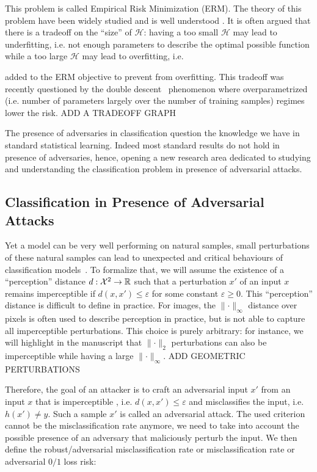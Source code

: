 This problem is called Empirical Risk Minimization (ERM). The theory of this problem have been widely studied and is well understood . It is often argued that there is a tradeoff on the ``size'' of $\mathcal{H}$: having a too small $\mathcal{H}$ may lead to underfitting, i.e. not enough parameters to describe the optimal possible function while a too large $\mathcal{H}$ may lead to overfitting, i.e.


added to the ERM objective to prevent from overfitting. This tradeoff was recently questioned by the double descent~\citep{belkin2019reconciling} phenomenon where overparametrized (i.e. number of parameters largely over the number of training samples) regimes lower the risk.
ADD A TRADEOFF GRAPH

The presence of adversaries in classification question the knowledge we have in standard statistical learning. Indeed most standard results do not hold in presence of adversaries, hence, opening a new research area dedicated to studying and understanding the classification problem in presence of adversarial attacks.

\subsection{Classification in Presence of Adversarial Attacks}

Yet a model can be very well performing on natural samples, small perturbations of these natural samples can lead to unexpected and critical behaviours of classification models~\citep{biggio2013evasion,Szegedy2013IntriguingPO}. To formalize that, we will assume the existence of a ``perception'' distance $d:\mathcal{X}^2\to\mathbb{R}$ such that a perturbation $x'$ of an input $x$ remains imperceptible if $d(x,x')\leq \varepsilon$ for some constant $\varepsilon\geq0$. This ``perception'' distance is difficult to define in practice. For images, the $\lVert\cdot\rVert_\infty$ distance over pixels is often used to describe perception in practice, but is not able to capture all imperceptible perturbations.  This choice is purely arbitrary: for instance, we will highlight in the manuscript that $\lVert\cdot\rVert_2$ perturbations can also be imperceptible while having a large $\lVert\cdot\rVert_\infty$. ADD GEOMETRIC PERTURBATIONS

Therefore, the goal of an attacker is to craft an adversarial input $x'$ from an input $x$ that is imperceptible , i.e. $d(x,x')\leq \varepsilon$ and misclassifies the input, i.e. $h(x')\neq y$. Such a sample $x'$ is called an adversarial attack. The used criterion cannot be the misclassification rate anymore, we need to take into account the possible presence of an adversary that maliciously perturb the input. We then define the robust/adversarial misclassification rate or  misclassification rate or adversarial $0/1$ loss risk: 

